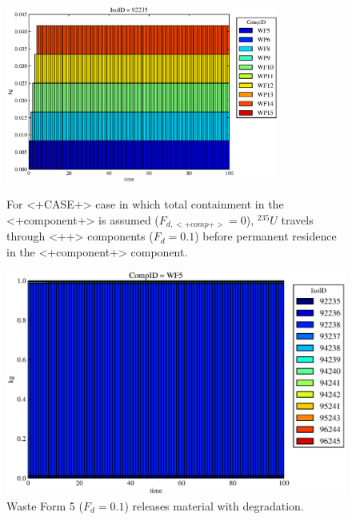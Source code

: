 \begin{figure}[ht]
\centering
\includegraphics[width=0.8\textwidth]{./chapters/demonstration/no_release/lpEMII.eps}
\caption[$^{235}U$ residence. Lumped Parameter  <+Component+> No Release.]{
For <+CASE+> case in which total containment in the <+component+> is assumed 
($F_{d,<+comp+>}=0$), $^{235}U$ travels through <++> components ($F_d = 0.1$) before 
permanent residence in the <+component+> component.
}
\label{fig:lpEMIIall}
\begin{minipage}[b]{0.45\linewidth}

  \includegraphics[width=\textwidth]{./chapters/demonstration/no_release/lpEMII1.eps}
  \caption[LPEMII Waste Form Contaminants.]{
    Waste Form 5 ($F_d = 0.1$) releases material with degradation. 
    }
  \label{fig:lpEMIIwf5}
  

\end{minipage}
\end{figure}
